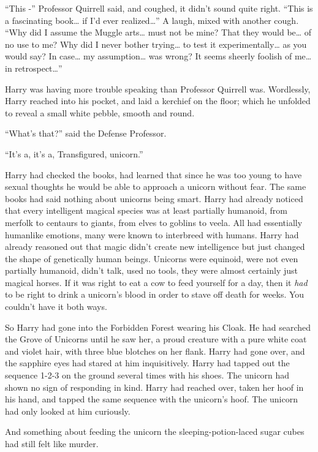 ``This -'' Professor Quirrell said, and coughed, it didn't sound quite
right. ``This is a fascinating book\ldots{} if I'd ever
realized\ldots{}'' A laugh, mixed with another cough. ``Why did I assume
the Muggle arts\ldots{} must not be mine? That they would be\ldots{} of
no use to me? Why did I never bother trying\ldots{} to test it
experimentally\ldots{} as you would say? In case\ldots{} my
assumption\ldots{} was wrong? It seems sheerly foolish of me\ldots{} in
retrospect\ldots{}''

Harry was having more trouble speaking than Professor Quirrell was.
Wordlessly, Harry reached into his pocket, and laid a kerchief on the
floor; which he unfolded to reveal a small white pebble, smooth and
round.

``What's that?'' said the Defense Professor.

``It's a, it's a, Transfigured, unicorn.''

Harry had checked the books, had learned that since he was too young to
have sexual thoughts he would be able to approach a unicorn without
fear. The same books had said nothing about unicorns being smart. Harry
had already noticed that every intelligent magical species was at least
partially humanoid, from merfolk to centaurs to giants, from elves to
goblins to veela. All had essentially humanlike emotions, many were
known to interbreed with humans. Harry had already reasoned out that
magic didn't create new intelligence but just changed the shape of
genetically human beings. Unicorns were equinoid, were not even
partially humanoid, didn't talk, used no tools, they were almost
certainly just magical horses. If it was right to eat a cow to feed
yourself for a day, then it \emph{had} to be right to drink a unicorn's
blood in order to stave off death for weeks. You couldn't have it both
ways.

So Harry had gone into the Forbidden Forest wearing his Cloak. He had
searched the Grove of Unicorns until he saw her, a proud creature with a
pure white coat and violet hair, with three blue blotches on her flank.
Harry had gone over, and the sapphire eyes had stared at him
inquisitively. Harry had tapped out the sequence 1-2-3 on the ground
several times with his shoes. The unicorn had shown no sign of
responding in kind. Harry had reached over, taken her hoof in his hand,
and tapped the same sequence with the unicorn's hoof. The unicorn had
only looked at him curiously.

And something about feeding the unicorn the sleeping-potion-laced sugar
cubes had still felt like murder.

